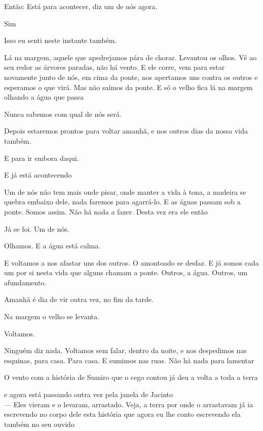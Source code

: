 Então: Está para acontecer, diz um de nós agora.

Sim

Isso eu senti neste instante também.

Lá na margem, aquele que apedrejamos pára de chorar. Levantou os olhos.
Vê ao seu redor as árvores paradas, não há vento. E ele corre, vem para
estar novamente junto de nós, em cima da ponte, nos apertamos uns contra
os outros e esperamos o que virá. Mas não saímos da ponte. E só o velho
fica lá na margem olhando a água que passa

Nunca sabemos com qual de nós será.

Depois estaremos prontos para voltar amanhã, e nos outros dias da nossa
vida também.

E para ir embora daqui.

E já está acontecendo

Um de nós não tem mais onde pisar, onde manter a vida à tona, a madeira
se quebra embaixo dele, nada faremos para agarrá-lo. E as águas passam
sob a ponte. Somos assim. Não há nada a fazer. Desta vez era ele então

Já se foi. Um de nós.

Olhamos. E a água está calma.

E voltamos a nos afastar uns dos outros. O amontoado se desfaz. E já
somos cada um por si nesta vida que alguns chamam a ponte. Outros, a
água. Outros, um afundamento.

Amanhã é dia de vir outra vez, no fim da tarde.

Na margem o velho se levanta.

Voltamos.

Ninguém diz nada. Voltamos sem falar, dentro da noite, e nos despedimos
nas esquinas, para casa. Para casa. E sumimos nas ruas. Não há nada para
lamentar

\breakk

\clearpage
\thispagestyle{empty}

\movetooddpage

\vspace*{4cm}

O vento com a história de Sumiro que o cego contou já deu a volta a toda
a terra

e agora está passando outra vez pela janela de Jacinto\\

--- Eles vieram e o levaram, arrastado. Veja, a terra por onde o
arrastavam já ia escrevendo no corpo dele esta história que agora eu lhe
conto escrevendo ela também no seu ouvido

